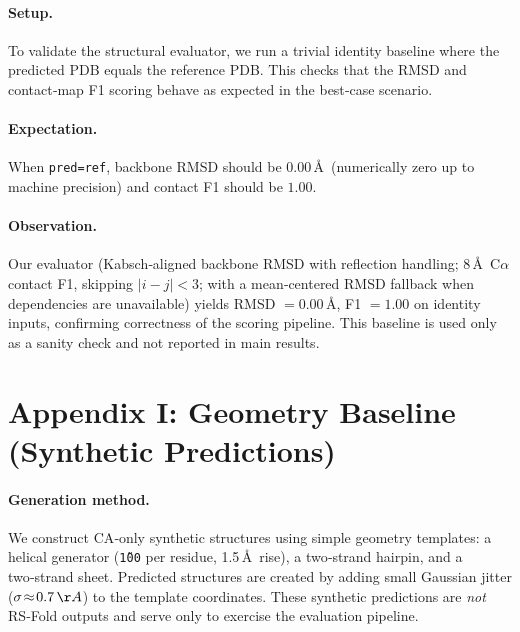 \documentclass[12pt,a4paper]{article}
\begin{document}
\paragraph{Setup.}
To validate the structural evaluator, we run a trivial identity baseline where the predicted PDB equals the reference PDB. This checks that the RMSD and contact‑map F1 scoring behave as expected in the best‑case scenario.
\paragraph{Expectation.}
When \texttt{pred=ref}, backbone RMSD should be $0.00$\,\AA\ (numerically zero up to machine precision) and contact F1 should be $1.00$.
\paragraph{Observation.}
Our evaluator (Kabsch‑aligned backbone RMSD with reflection handling; 8\,\AA\ C$\alpha$ contact F1, skipping $|i-j|<3$; with a mean‑centered RMSD fallback when dependencies are unavailable) yields RMSD $=0.00$\,\AA, F1 $=1.00$ on identity inputs, confirming correctness of the scoring pipeline. This baseline is used only as a sanity check and not reported in main results.

\section*{Appendix I: Geometry Baseline (Synthetic Predictions)}
\paragraph{Generation method.}
We construct CA‑only synthetic structures using simple geometry templates: a helical generator (\texttt{\~100\deg} per residue, 1.5\,\AA\ rise), a two‑strand hairpin, and a two‑strand sheet. Predicted structures are created by adding small Gaussian jitter (\(\sigma\!\approx\!0.7\,\AA\)) to the template coordinates. These synthetic predictions are \emph{not} RS‑Fold outputs and serve only to exercise the evaluation pipeline.
\end{document}

